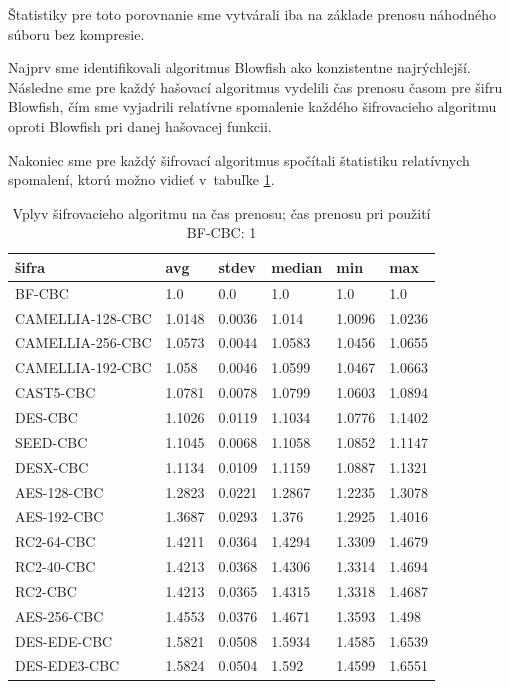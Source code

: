 \documentclass[12pt,a4paper]{article}
\begin{document}
Štatistiky pre toto porovnanie sme vytvárali iba na základe prenosu
náhodného súboru bez kompresie.

Najprv sme identifikovali algoritmus Blowfish ako konzistentne
najrýchlejší. Následne sme pre každý hašovací algoritmus vydelili čas
prenosu časom pre šifru Blowfish, čím sme vyjadrili relatívne spomalenie
každého šifrovacieho algoritmu oproti Blowfish pri danej hašovacej funkcii.

Nakoniec sme pre každý šifrovací algoritmus spočítali štatistiku
relatívnych spomalení, ktorú možno vidieť v~tabuľke
\ref{tbl:cipher-comparison}.

\begin{table}[h]\centering
   \begin{tabular}{|l||l|l|l|l|l|}
        \hline
        \bf šifra & \bf  avg & \bf stdev & \bf median & \bf min & \bf max \\ \hline 
        BF-CBC & 1.0 & 0.0 & 1.0 & 1.0 & 1.0\\ \hline
        CAMELLIA-128-CBC & 1.0148 & 0.0036 & 1.014 & 1.0096 & 1.0236 \\ \hline
        CAMELLIA-256-CBC & 1.0573 & 0.0044 & 1.0583 & 1.0456 & 1.0655 \\ \hline
        CAMELLIA-192-CBC & 1.058 & 0.0046 & 1.0599 & 1.0467 & 1.0663 \\ \hline
        CAST5-CBC & 1.0781 & 0.0078 & 1.0799 & 1.0603 & 1.0894 \\ \hline
        DES-CBC & 1.1026 & 0.0119 & 1.1034 & 1.0776 & 1.1402 \\ \hline
        SEED-CBC & 1.1045 & 0.0068 & 1.1058 & 1.0852 & 1.1147 \\ \hline
        DESX-CBC & 1.1134 & 0.0109 & 1.1159 & 1.0887 & 1.1321 \\ \hline
        AES-128-CBC & 1.2823 & 0.0221 & 1.2867 & 1.2235 & 1.3078 \\ \hline
        AES-192-CBC & 1.3687 & 0.0293 & 1.376 & 1.2925 & 1.4016 \\ \hline
        RC2-64-CBC & 1.4211 & 0.0364 & 1.4294 & 1.3309 & 1.4679 \\ \hline
        RC2-40-CBC & 1.4213 & 0.0368 & 1.4306 & 1.3314 & 1.4694 \\ \hline
        RC2-CBC & 1.4213 & 0.0365 & 1.4315 & 1.3318 & 1.4687 \\ \hline
        AES-256-CBC & 1.4553 & 0.0376 & 1.4671 & 1.3593 & 1.498 \\ \hline
        DES-EDE-CBC & 1.5821 & 0.0508 & 1.5934 & 1.4585 & 1.6539 \\ \hline
        DES-EDE3-CBC & 1.5824 & 0.0504 & 1.592 & 1.4599 & 1.6551 \\ \hline
    \end{tabular}
    \caption{Vplyv šifrovacieho algoritmu na čas prenosu; čas prenosu pri použití BF-CBC: 1}
    \label{tbl:cipher-comparison}
\end{table}
\end{document}
